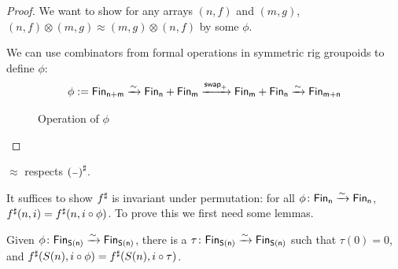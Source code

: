 \begin{proof}
We want to show for any arrays $(n, f)$ and $(m, g)$, $(n, f) \otimes (m, g) \approx (m, g) \otimes (n, f)$
by some $\phi$.

We can use combinators from formal operations in symmetric rig groupoids \cite{choudhurySymmetriesReversibleProgramming2022} to define $\phi$:
\begin{align*}
    \phi := \Fin[n+m] \xto{\sim} \Fin[n] + \Fin[m] \xto{\term{swap}_{+}} \Fin[m] + \Fin[n] \xto{\sim} \Fin[m+n] \\
\end{align*}

\begin{figure}[H]
    \centering
    \caption{Operation of $\phi$}
    \label{fig:enter-label}
\end{figure}

\end{proof}

\begin{proposition}
    $\approx$ respects ${({\scriptstyle{-}})}^{\sharp}$.
\end{proposition}

It suffices to show ${f}^{\sharp}$ is invariant under permutation: for all $\phi\colon \Fin[n]\xto{\sim}\Fin[n]$,
$\ext{f}(n, i) \id \ext{f}(n, i \circ \phi)$. To prove this we first need some lemmas.

\begin{lemma}\label{bag:tau}
Given $\phi\colon \Fin[S(n)]\xto{\sim}\Fin[S(n)]$, there is a $\tau\colon \Fin[S(n)]\xto{\sim}\Fin[S(n)]$
such that $\tau(0) = 0$, and ${f}^{\sharp}(S(n), i \circ \phi) = {f}^{\sharp}(S(n), i \circ \tau)$.
\end{lemma}


